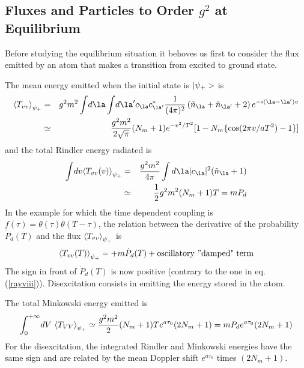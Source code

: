 \subsection{Fluxes and Particles to Order $g^2$ at Equilibrium}

Before studying the equilibrium situation it behoves us first to consider the
flux emitted by an atom that makes a transition from excited to ground state.

The mean energy emitted when the initial state is $\mbox{$ \vert \psi_+ > $}$ is
\begin{eqnarray}
\bk{T_{vv}}_{\psi_+} &=&
 g^2 m^2
\int\!
d\la \int \! d\la^\prime c_\la c_{\la^\prime}^*
{1 \over (4 \pi)^2}
\left (  \tilde n_\la + \tilde n_{\la^\prime}  + 2 \right)
e^{-i(\la-\la^\prime)v}\nonumber\\
&\simeq&{g^2 m^2 \over 2 \sqrt{\pi}}
(N_m + 1) e^{-v^2/T^2}
[ 1 - N_m \{ \cos (2 \pi v/a T^2) -1 \} ]
\label{rayxv}
\end{eqnarray}
and the total Rindler energy radiated is
\begin{eqnarray}
\int\! dv \bk{T_{vv}(v)}_{\psi_+} &=&   {g^2
m^2 \over 4 \pi} \int
d\la
\vert c_\la \vert^2  (\tilde n_\la + 1)
\nonumber\\  &\simeq&
{1 \over 2} g^2 m^2 (N_m+1)T   = m P_{d}
\label{rayxvi}
\end{eqnarray}
In the example for which the time dependent
coupling is $f(\tau) = \theta(\tau) \theta( T- \tau)$,
the relation between the derivative of the probability
$ \dot P_{d}(T)$ and the flux $ \mbox{$ \langle T_{vv} \rangle $}_{\psi_+}$ is
 \begin{equation}
 \mbox{$ \langle T_{vv}(T) \rangle $}_{\psi_+} =
+ m \dot P_{d}(T) + \hbox{oscillatory ''damped" term}
\label{rayxvii}
\end{equation}
The sign in front of $ \dot P_d(T)$ is now positive (contrary to the one
in eq. (\ref{rayviii})).
Disexcitation  consists in emitting the energy stored in the atom.

The total
Minkowski
energy emitted
is
\begin{eqnarray}
 \int^{+\infty}_{0}\! dV \ \mbox{$ \langle T_{V V} \rangle $}_{\psi_+}
\simeq {g^2 m^2 \over 2}(N_m+1)T e^{a \tau_0}(2 N_m + 1) =
m P_{d} e^{a \tau_0}(2 N_m + 1)
\end{eqnarray}
For the disexcitation, the integrated Rindler and Minkowski energies
have the same sign and are related by the mean Doppler shift
$e^{a \tau_0}$ times $(2 N_m + 1)$.

